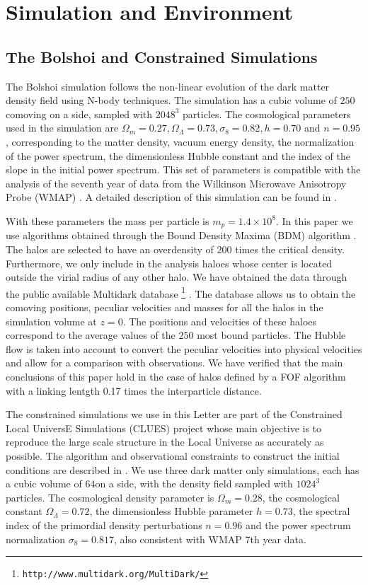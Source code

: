 \documentclass{emulateapj}
\newcommand{\hMpc}{{\ifmmode{h^{-1}{\rm Mpc}}\else{$h^{-1}$Mpc }\fi}}
\newcommand{\hMsun}{{\ifmmode{h^{-1}{\rm {M_{\odot}}}}\else{$h^{-1}{\rm{M_{\odot}}}$}\fi}}
\begin{document}
\section{Simulation and Environment}
\label{sec:methods}
\subsection{The Bolshoi and Constrained Simulations}



The Bolshoi simulation follows the non-linear evolution of the dark matter density field using N-body techniques. The simulation has a cubic volume of $250$\hMpc comoving on a side, sampled with $2048^{3}$ particles. The cosmological parameters used in the simulation are $\Omega_{m}=0.27, \Omega_{\Lambda}=0.73, \sigma_{8}=0.82, h=0.70$ and $n=0.95$, corresponding to the matter density, vacuum energy density, the normalization of the power spectrum, the dimensionless Hubble constant and the index of the slope in the initial power spectrum. This set of parameters is compatible with the analysis  of the seventh year of data from the Wilkinson Microwave Anisotropy Probe (WMAP) \citep{Jarosik2011}. A detailed description of this simulation can be found in \citep{Bolshoi}.

With these parameters the mass per particle is $m_{p}=1.4\times 10^{8}$\hMsun. In this paper we use algorithms obtained through the Bound Density Maxima (BDM) algorithm \citep{KlypinBDM}. The halos are selected to have an overdensity of 200 times the critical density. Furthermore, we only include in the analysis haloes whose center is located outside the virial radius of any other halo.  We have obtained the data through the public available Multidark database \footnote{{\tt http://www.multidark.org/MultiDark/}} \citep{2011arXiv1109.0003R}. The database allows us to obtain the comoving positions, peculiar velocities and masses for all the halos in the simulation volume at $z=0$. The positions and velocities of these haloes correspond to the average values of the $250$ most bound particles. The Hubble flow is taken into account to convert the peculiar velocities into physical velocities and allow for a comparison with observations. We have verified that the main conclusions of this paper hold in the case of halos defined by a FOF algorithm with a linking lentgth 0.17 times the interparticle distance.

The constrained simulations we use in this Letter are part of the Constrained Local UniversE Simulations (CLUES) project whose main objective is to reproduce the large scale structure in the Local Universe as accurately as possible. The algorithm and observational constraints to construct the initial conditions are  described in \citep{clues2010}.  We use three dark matter only simulations, each has a cubic volume of $64$\hMpc on a side, with the density field sampled with $1024^3$ particles. The cosmological density parameter is $\Omega_m=0.28$, the cosmological constant $\Omega_{\Lambda}=0.72$, the dimensionless Hubble parameter $h=0.73$, the spectral index of the primordial density perturbations $n=0.96$ and the power spectrum normalization $\sigma_{8}=0.817$, also consistent with WMAP 7th year data. 
\end{document}
